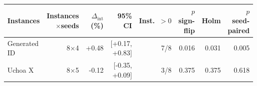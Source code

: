 \begin{tabular}{lrrrrrrr}
\toprule
Instances & Instances$\times$seeds & $\Delta_{\mathrm{int}}$ (\%) & 95\% CI & Inst.\ $>0$ & $p$ sign-flip & Holm & $p$ seed-paired \\
\midrule
Generated ID & 8$\times$4 & +0.48 & [+0.17, +0.83] & 7/8 & 0.016 & 0.031 & 0.005 \\
Uchoa X & 8$\times$5 & -0.12 & [-0.35, +0.09] & 3/8 & 0.375 & 0.375 & 0.618 \\
\bottomrule
\end{tabular}
